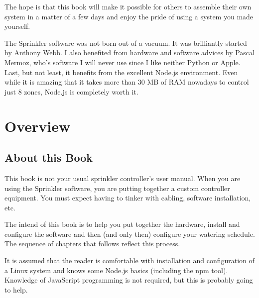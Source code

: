 \documentclass[11pt]{book}
\begin{document}
The hope is that this book will make it possible for others to assemble their own system in a matter of a few days and enjoy the pride of using a system you made yourself.

The Sprinkler software was not born out of a vacuum. It was brilliantly started by Anthony Webb. I also benefited from hardware and software advices by Pascal Mermoz, who's software I will never use since I like neither Python or Apple. Last, but not least, it benefits from the excellent Node.js environment. Even while it is amazing that it takes more than 30 MB of RAM nowadays to control just 8 zones, Node.js is completely worth it.

\mainmatter
\chapter{Overview}
\section{About this Book}
This book is not your usual sprinkler controller's user manual. When you are using the Sprinkler software, you are putting together a custom controller equipment. You must expect having to tinker with cabling, software installation, etc.

The intend of this book is to help you put together the hardware, install and configure the software and then (and only then) configure your watering schedule. The sequence of chapters that follows reflect this process.

It is assumed that the reader is comfortable with  installation and configuration of a Linux system and knows some Node.js basics  (including the npm tool). Knowledge of JavaScript programming is not required, but this is probably going to help.
\end{document}

